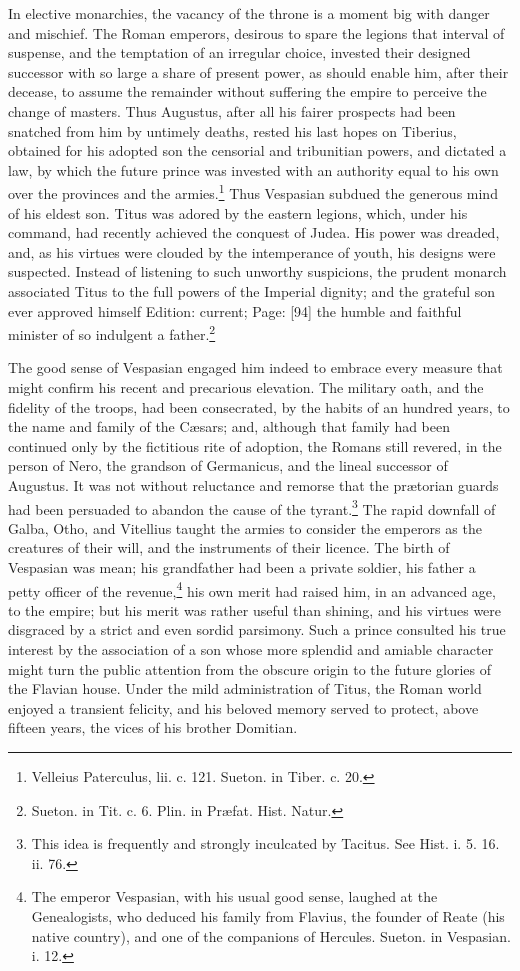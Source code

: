 In elective monarchies, the vacancy of the throne is a moment big with danger and mischief. The Roman emperors, desirous to spare the legions that interval of suspense, and the temptation of an irregular choice, invested their designed successor with so large a share of present power, as should enable him, after their decease, to assume the remainder without suffering the empire to perceive the change of masters. Thus Augustus, after all his fairer prospects had been snatched from him by untimely deaths, rested his last hopes on Tiberius, obtained for his adopted son the censorial and tribunitian powers, and dictated a law, by which the future prince was invested with an authority equal to his own over the provinces and the armies.\footnote{Velleius Paterculus, lii. c. 121. Sueton. in Tiber. c. 20.} Thus Vespasian subdued the generous mind of his eldest son. Titus was adored by the eastern legions, which, under his command, had recently achieved the conquest of Judea. His power was dreaded, and, as his virtues were clouded by the intemperance of youth, his designs were suspected. Instead of listening to such unworthy suspicions, the prudent monarch associated Titus to the full powers of the Imperial dignity; and the grateful son ever approved himself Edition: current; Page: [94] the humble and faithful minister of so indulgent a father.\footnote{Sueton. in Tit. c. 6. Plin. in Præfat. Hist. Natur.}

The good sense of Vespasian engaged him indeed to embrace every measure that might confirm his recent and precarious elevation. The military oath, and the fidelity of the troops, had been consecrated, by the habits of an hundred years, to the name and family of the Cæsars; and, although that family had been continued only by the fictitious rite of adoption, the Romans still revered, in the person of Nero, the grandson of Germanicus, and the lineal successor of Augustus. It was not without reluctance and remorse that the prætorian guards had been persuaded to abandon the cause of the tyrant.\footnote{This idea is frequently and strongly inculcated by Tacitus. See Hist. i. 5. 16. ii. 76.} The rapid downfall of Galba, Otho, and Vitellius taught the armies to consider the emperors as the creatures of their will, and the instruments of their licence. The birth of Vespasian was mean; his grandfather had been a private soldier, his father a petty officer of the revenue,\footnote{The emperor Vespasian, with his usual good sense, laughed at the Genealogists, who deduced his family from Flavius, the founder of Reate (his native country), and one of the companions of Hercules. Sueton. in Vespasian. i. 12.} his own merit had raised him, in an advanced age, to the empire; but his merit was rather useful than shining, and his virtues were disgraced by a strict and even sordid parsimony. Such a prince consulted his true interest by the association of a son whose more splendid and amiable character might turn the public attention from the obscure origin to the future glories of the Flavian house. Under the mild administration of Titus, the Roman world enjoyed a transient felicity, and his beloved memory served to protect, above fifteen years, the vices of his brother Domitian.

